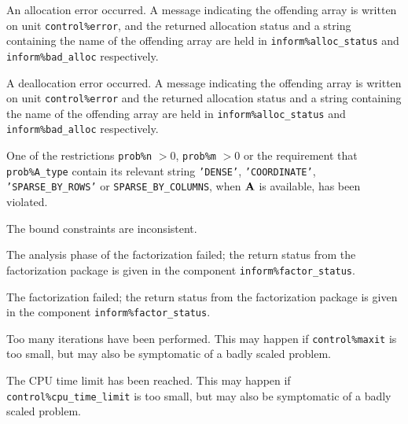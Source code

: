 \documentclass{galahad}
\begin{document}
\begin{description}

 An allocation error occurred. A message indicating
the offending
array is written on unit {\tt control\%error}, and the returned allocation
status and a string containing the name of the offending array
are held in {\tt inform\%alloc\_\-status}
and {\tt inform\%bad\_alloc} respectively.

 A deallocation error occurred.
A message indicating the offending
array is written on unit {\tt control\%error} and the returned allocation
status and a string containing the name of the offending array
are held in {\tt inform\%alloc\_\-status}
and {\tt inform\%bad\_alloc} respectively.

 One of the restrictions
 {\tt prob\%n} $> 0$,
 {\tt prob\%m} $> 0$
    or the requirement that
    {\tt prob\%A\_type} contain its relevant string
    {\tt 'DENSE'}, {\tt 'COORDINATE'}, {\tt 'SPARSE\_BY\_ROWS'}
    or {\tt SPARSE\_BY\_COLUMNS},
    when ${\mathbf{A}}$ is available,  has been violated.


 The bound constraints are inconsistent.


 The analysis phase of the factorization failed;
  the return status from the factorization
    package is given in the component {\tt inform\%fac\-t\-or\_status}.

 The factorization failed; the return status
  from the factorization
    package is given in the component {\tt inform\%fac\-t\-or\_status}.



 Too many iterations have been performed.
   This may happen if
    {\tt control\%maxit} is too small, but may also be symptomatic of
    a badly scaled problem.

 The CPU time limit has been reached. This may happen if
    {\tt control\%cpu\_time\_limit} is too small, but may also be symptomatic
    of a badly scaled problem.


\end{description}
\end{document}
